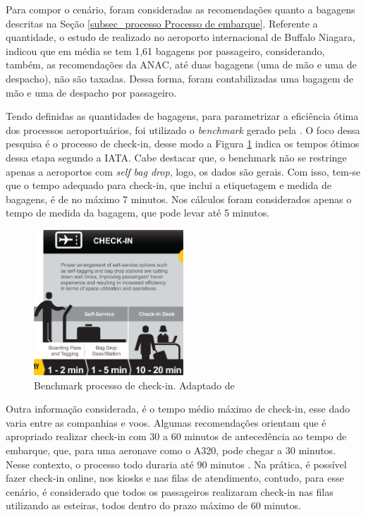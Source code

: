     Para compor o cenário, foram consideradas as recomendações quanto a bagagens descritas na Seção \ref{subsec_processo Processo de embarque}. Referente a quantidade, o estudo de  realizado no aeroporto internacional de Buffalo Niagara, indicou que em média se tem 1,61 bagagens por passageiro, considerando, também, as recomendações da ANAC, até duas bagagens (uma de mão e uma de despacho), não são taxadas. Dessa forma, foram contabilizadas uma bagagem de mão e uma de despacho por passageiro. 

    Tendo definidas as quantidades de bagagens, para parametrizar a eficiência ótima dos processos aeroportuários, foi utilizado o \textit{benchmark} gerado pela . O foco dessa pesquisa é o processo de check-in, desse modo a Figura \ref{fig:tempoDeCheckinSegundoANAC} indica os tempos ótimos dessa etapa segundo a IATA. Cabe destacar que, o benchmark não se restringe apenas a aeroportos com \textit{self bag drop}, logo, os dados são gerais. Com isso, tem-se que o tempo adequado para check-in, que inclui a etiquetagem e medida de bagagens, é de no máximo 7 minutos. Nos cálculos foram considerados apenas o tempo de medida da bagagem, que pode levar até 5 minutos. 

        \begin{figure}[h!]
           \centering
           \includegraphics[width=0.5\textwidth]{imagens/tempoDeCheckinSegundoANAC.png} 
           \caption{Benchmark processo de check-in. Adaptado de \cite{iata_2022_level}}
           \label{fig:tempoDeCheckinSegundoANAC}
        \end{figure}

    Outra informação considerada, é o tempo médio máximo de check-in, esse dado varia entre as companhias e voos. Algumas recomendações orientam que é apropriado realizar check-in com 30 a 60 minutos de antecedência ao tempo de embarque, que, para uma aeronave como o A320, pode chegar a 30 minutos. Nesse contexto, o processo todo duraria até 90 minutos \cite{universityofminnesota_2022_airport, anac_2016_anac}. Na prática, é possível fazer check-in online, nos kiosks e nas filas de atendimento, contudo, para esse cenário, é considerado que todos os passageiros realizaram check-in nas filas utilizando as esteiras, todos dentro do prazo máximo de 60 minutos. 

